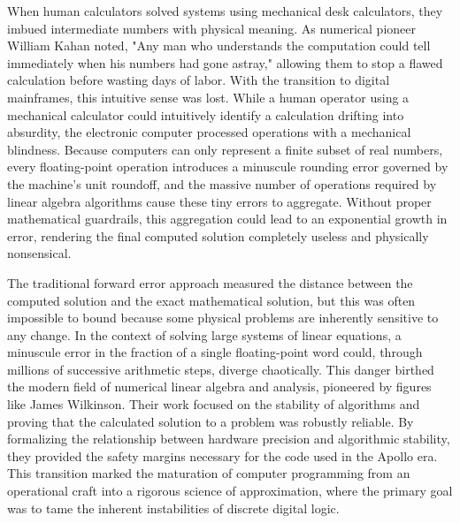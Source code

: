 When human calculators solved systems using mechanical desk calculators, they imbued intermediate numbers with physical meaning. As numerical pioneer William Kahan noted, "Any man who understands the computation could tell immediately when his numbers had gone astray," allowing them to stop a flawed calculation before wasting days of labor. With the transition to digital mainframes, this intuitive sense was lost. While a human operator using a mechanical calculator could intuitively identify a calculation drifting into absurdity, the electronic computer processed operations with a mechanical blindness. Because computers can only represent a finite subset of real numbers, every floating-point operation introduces a minuscule rounding error governed by the machine's unit roundoff, and the massive number of operations required by linear algebra algorithms cause these tiny errors to aggregate. Without proper mathematical guardrails, this aggregation could lead to an exponential growth in error, rendering the final computed solution completely useless and physically nonsensical.

The traditional forward error approach measured the distance between the computed solution and the exact mathematical solution, but this was often impossible to bound because some physical problems are inherently sensitive to any change. In the context of solving large systems of linear equations, a minuscule error in the fraction of a single floating-point word could, through millions of successive arithmetic steps, diverge chaotically. This danger birthed the modern field of numerical linear algebra and analysis, pioneered by figures like James Wilkinson. Their work focused on the stability of algorithms and proving that the calculated solution to a problem was robustly reliable. By formalizing the relationship between hardware precision and algorithmic stability, they provided the safety margins necessary for the code used in the Apollo era. This transition marked the maturation of computer programming from an operational craft into a rigorous science of approximation, where the primary goal was to tame the inherent instabilities of discrete digital logic. 

